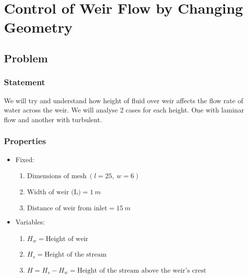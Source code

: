 \documentclass[11pt]{article}
\title{}
\author{}
\providecommand{\tightlist}{%
      \setlength{\itemsep}{0pt}\setlength{\parskip}{0pt}}
\begin{document}
    \maketitle




    \hypertarget{control-of-weir-flow-by-changing-geometry}{%
\section{Control of Weir Flow by Changing
Geometry}\label{control-of-weir-flow-by-changing-geometry}}

\hypertarget{problem}{%
\subsection{Problem}\label{problem}}

\hypertarget{statement}{%
\subsubsection{Statement}\label{statement}}

We will try and understand how height of fluid over weir affects the
flow rate of water across the weir. We will analyse 2 cases for each
height. One with laminar flow and another with turbulent.

\hypertarget{properties}{%
\subsubsection{Properties}\label{properties}}

\begin{itemize}
\tightlist
\item
  Fixed:

  \begin{enumerate}
  \def\labelenumi{\arabic{enumi}.}
  \tightlist
  \item
    \(\text{Dimensions of mesh}\ (l = 25,\ w = 6)\)
  \item
    \(\text{Width of weir (L)} = 1\ m\)
  \item
    \(\text{Distance of weir from inlet} = 15\ m\)
  \end{enumerate}
\item
  Variables:

  \begin{enumerate}
  \def\labelenumi{\arabic{enumi}.}
  \tightlist
  \item
    \(H_w = \text{Height of weir}\)
  \item
    \(H_s = \text{Height of the stream}\)
  \item
    \(H = H_s - H_w = \text{Height of the stream above the weir's crest}\)
  \end{enumerate}
\end{itemize}
\end{document}

